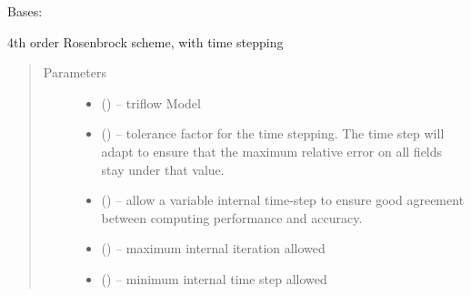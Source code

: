 \documentclass[letterpaper,10pt,english]{sphinxmanual}
\begin{document}
\begin{fulllineitems}
\label{\detokenize{triflow.plugins:triflow.plugins.schemes.ROS3PRL}}
Bases: {\hyperref[\detokenize{triflow.plugins:triflow.plugins.schemes.ROW_general}]{}}

4th order Rosenbrock scheme, with time stepping
\begin{quote}\begin{description}
\item[{Parameters}] \leavevmode\begin{itemize}
\item {} 
 () -- triflow Model

\item {} 
 (\sphinxstyleliteralemphasis{, }\sphinxstyleliteralemphasis{, }) -- tolerance factor for the time stepping. The time step will adapt to ensure that the maximum relative error on all fields stay under that value.

\item {} 
 (\sphinxstyleliteralemphasis{, }\sphinxstyleliteralemphasis{, }) -- allow a variable internal time-step to ensure good agreement between computing performance and accuracy.

\item {} 
 (\sphinxstyleliteralemphasis{, }\sphinxstyleliteralemphasis{, }) -- maximum internal iteration allowed

\item {} 
 (\sphinxstyleliteralemphasis{, }\sphinxstyleliteralemphasis{, }) -- minimum internal time step allowed


\end{itemize}
\end{description}
\end{quote}
\end{fulllineitems}
\end{document}
